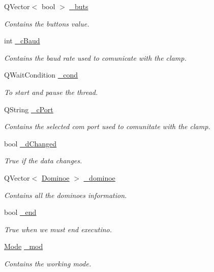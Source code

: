\begin{DoxyCompactItemize}
Q\+Vector$<$ bool $>$ \hyperlink{a00008_a6f956f7e0f2953e213ff95fb64857ab0}{\+\_\+buts}
\begin{DoxyCompactList}\small\item\em Contains the buttons value. \end{DoxyCompactList}\item 
int \hyperlink{a00008_a9fccfd415e2e55c8abef7fcc6535af30}{\+\_\+c\+Baud}
\begin{DoxyCompactList}\small\item\em Contains the baud rate used to comunicate with the clamp. \end{DoxyCompactList}\item 
Q\+Wait\+Condition \hyperlink{a00008_afcb93c09acd7fecf47d92996a297365c}{\+\_\+cond}
\begin{DoxyCompactList}\small\item\em To start and pause the thread. \end{DoxyCompactList}\item 
Q\+String \hyperlink{a00008_ab52437b31a433c427a6c050f2b1cc959}{\+\_\+c\+Port}
\begin{DoxyCompactList}\small\item\em Contains the selected com port used to comunitate with the clamp. \end{DoxyCompactList}\item 
bool \hyperlink{a00008_a2b6ccfeacbb3cc9ac5c34549b9aa3f11}{\+\_\+d\+Changed}
\begin{DoxyCompactList}\small\item\em True if the data changes. \end{DoxyCompactList}\item 
Q\+Vector$<$ \hyperlink{a00002}{Dominoe} $>$ \hyperlink{a00008_aeeb7452b80b36d66b59add7f55061a99}{\+\_\+dominoe}
\begin{DoxyCompactList}\small\item\em Contains all the dominoes information. \end{DoxyCompactList}\item 
bool \hyperlink{a00008_acca9896d1a2d1ef68527e6834f81c76c}{\+\_\+end}
\begin{DoxyCompactList}\small\item\em True when we must end executino. \end{DoxyCompactList}\item 
\hyperlink{a00008_a8d581034e60792a9995d44065f6140a5}{Mode} \hyperlink{a00008_acdecea1688594d3ab7386a6db97dd90d}{\+\_\+mod}
\begin{DoxyCompactList}\small\item\em Contains the working mode. \end{DoxyCompactList}\item 

\end{DoxyCompactItemize}

